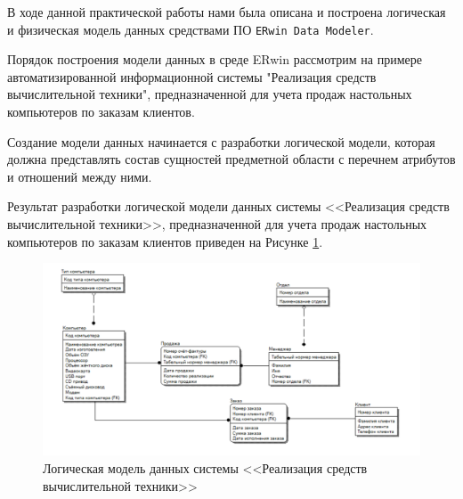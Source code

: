 \documentclass[a4paper,14pt]{extarticle}
\newcommand{\erdatamodaler}{\texttt{ERwin Data Modeler}}
\begin{document}
В ходе данной практической работы нами была описана и построена логическая и физическая модель данных средствами ПО \erdatamodaler.

Порядок построения модели данных в среде ERwin рассмотрим на примере
автоматизированной информационной системы "Реализация средств вычислительной
техники", предназначенной для учета продаж настольных компьютеров по заказам
клиентов.

Создание модели данных начинается с разработки логической модели, которая
должна представлять состав сущностей предметной области с перечнем атрибутов и
отношений между ними.

%
%
%
%

Результат разработки логической модели данных системы <<Реализация средств
вычислительной техники>>, предназначенной для учета продаж настольных
компьютеров по заказам клиентов приведен на Рисунке \ref{fig:2-logical-model-method}.

\begin{figure}[htpb]
	\centering
	\includegraphics[width=0.7\linewidth]{images/2-method}
	\caption{Логическая модель данных системы <<Реализация средств вычислительной техники>>}
	\label{fig:2-logical-model-method}
\end{figure}
\end{document}

